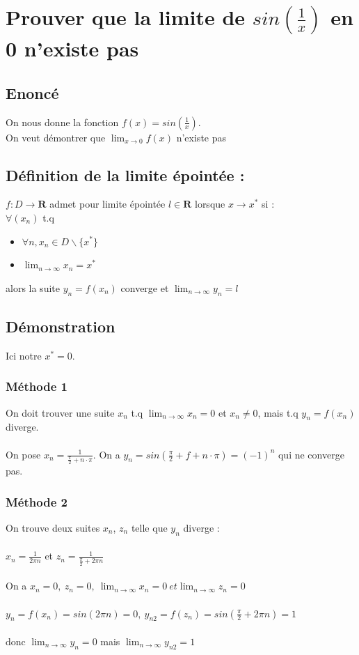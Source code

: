 \documentclass{article}
\begin{document}
\newpage
\section{Prouver que la limite de $ sin(\frac{1}{x}) $ en 0 n'existe pas}

\subsection{Enoncé}
On nous donne la fonction $ f(x) = sin(\frac{1}{x}) $.\\
On veut démontrer que $ \lim_{x\to{0}} f(x) $ n'existe pas
\subsection{Définition de la limite épointée :}
$ f : D \to \mathbf{R} $ admet pour limite épointée $ l \in \mathbf{R} $ lorsque $ x \to x^* $ si :\\
$ \forall (x_n) $ t.q
\begin{itemize}
    \item $\forall n, x_n \in D \backslash \{x^*\} $
    \item $ \lim_{n\to\infty} x_n = x^*$
\end{itemize}
alors la suite $ y_n = f(x_n) $ converge et $ \lim_{n\to\infty} y_n = l$
\subsection{Démonstration}
Ici notre $ x^* = 0 $. 
\subsubsection{Méthode 1}
On doit trouver une suite $ x_n $ t.q $ \lim_{n\to\infty}x_n= 0 $ et $ x_n \neq 0$, mais t.q $ y_n = f(x_n) $ diverge.\\\\
On pose $ x_n = \frac{1}{\frac{\pi}{2} + n \cdot \pi}$. On a $ y_n = sin(\frac{\pi}{2} + f+n \cdot \pi) = (-1)^n $ qui ne converge pas.
\subsubsection{Méthode 2}
On trouve deux suites $x_n$, $z_n$ telle que $y_n$ diverge : \\\\
$x_n = \frac{1}{2\pi n}$ et $z_n = \frac{1}{\frac{\pi}{2} + 2\pi{n}}$ \\\\
On a $x_n = 0,\ z_n = 0,\ \lim_{n\to\infty}x_n = 0\ et \lim_{n\to\infty}z_n = 0$ \\\\
$y_n = f(x_n) = sin(2\pi n) = 0,\ y_{n2} = f(z_n) = sin(\frac{\pi}{2} + 2\pi n) = 1$ \\\\
donc $\lim_{n\to\infty}y_n = 0$ mais $\lim_{n\to\infty}y_{n2} = 1$
\end{document}
